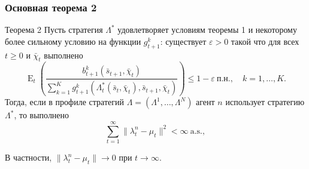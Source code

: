 \documentclass[10pt]{beamer}
\theoremstyle{definition}
\theoremstyle{remark}
\DeclareMathOperator{\E}{E}
\renewcommand{\epsilon}{\varepsilon}
\begin{document}



\begin{frame}\frametitle{Основная теорема 2}
	\begin{block}{Теорема 2}
    \label{theorem2-convergence}
    Пусть стратегия $\Lambda^*$ удовлетворяет условиям теоремы 1 и некоторому более сильному условию на функции $g_{t+1}^k$:  существует $\epsilon>0$ такой что для всех $t\ge 0$ и  $\bar \chi_t$ выполнено
    \begin{equation}
    \label{15-lambda-star-inequality-strong}
    \E_t\left( 
      \frac{b_{t+1}^k (\bar s_{t+1},\bar\chi_t)}
           {\sum_{k=1}^K g_{t+1}^k(\Lambda^*_t(\bar s_{t},\bar\chi_t), \bar s_{t+1},\bar\chi_t)}
      \right) \le 1-\epsilon\ \text{п.н.}, \quad k=1,\dots,K.
    \end{equation}
    Тогда, если в профиле стратегий $\Lambda=(\Lambda^1,\dots,\Lambda^N)$ агент $n$ использует стратегию $\Lambda^*$, то выполнено
    \[
    \sum_{t=1}^\infty \|\lambda_t^n - \mu_t\|^2 < \infty\ \text{a.s.},
    \]
    
    В частности, $\|\lambda_t^n - \mu_t\| \to 0$ при $t\to\infty$.

\end{block}

\end{frame}
\end{document}
